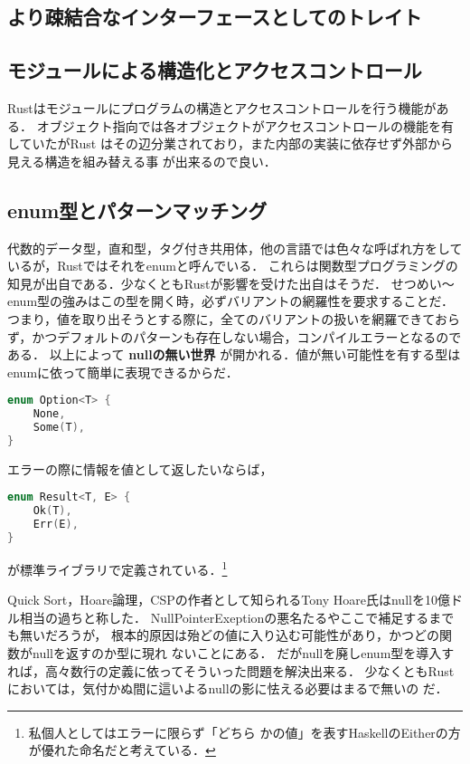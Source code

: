 \subsection{より疎結合なインターフェースとしてのトレイト}


\subsection{モジュールによる構造化とアクセスコントロール}
Rustはモジュールにプログラムの構造とアクセスコントロールを行う機能がある．
オブジェクト指向では各オブジェクトがアクセスコントロールの機能を有していたがRust
はその辺分業されており，また内部の実装に依存せず外部から見える構造を組み替える事
が出来るので良い．


\subsection{enum型とパターンマッチング}
代数的データ型，直和型，タグ付き共用体，他の言語では色々な呼ばれ方をしているが，Rustではそれをenumと呼んでいる．
これらは関数型プログラミングの知見が出自である．少なくともRustが影響を受けた出自はそうだ．
せつめい〜
enum型の強みはこの型を開く時，必ずバリアントの網羅性を要求することだ．
つまり，値を取り出そうとする際に，全てのバリアントの扱いを網羅できておらず，かつデフォルトのパターンも存在しない場合，コンパイルエラーとなるのである．
以上によって \textbf{nullの無い世界} が開かれる．値が無い可能性を有する型はenumに依って簡単に表現できるからだ．
\begin{lstlisting}[language={C++},caption=Option型,label=option_t]
enum Option<T> {
    None,
    Some(T),
}
\end{lstlisting}
エラーの際に情報を値として返したいならば，
\begin{lstlisting}[language={C++},caption=Result型,label=result_t]
enum Result<T, E> {
    Ok(T),
    Err(E),
}
\end{lstlisting}
が標準ライブラリで定義されている．\footnote{私個人としてはエラーに限らず「どちら
  かの値」を表すHaskellのEitherの方が優れた命名だと考えている．}

Quick Sort，Hoare論理，CSPの作者として知られるTony Hoare氏はnullを10億ドル相当の過ちと称した．
NullPointerExeptionの悪名たるやここで補足するまでも無いだろうが，
根本的原因は殆どの値に入り込む可能性があり，かつどの関数がnullを返すのか型に現れ
ないことにある．
だがnullを廃しenum型を導入すれば，高々数行の定義に依ってそういった問題を解決出来る．
少なくともRustにおいては，気付かぬ間に這いよるnullの影に怯える必要はまるで無いの
だ．

